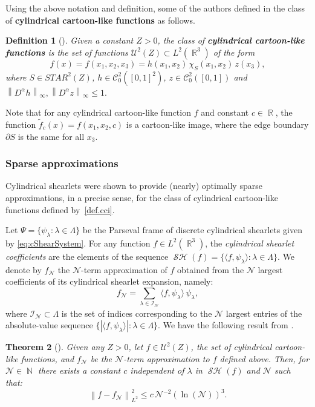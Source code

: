 \documentclass[11pt,a4paper]{article}
\numberwithin{equation}{section}
\newtheorem{theorem}{Theorem}[]
\newtheorem{definition}[theorem]{Definition}
\DeclareMathOperator{\R}{\mathbb{R}}
\DeclareMathOperator{\N}{\mathbb{N}}
\newcommand{\norm}[1]{\left\lVert#1\right\rVert}
\newcommand{\SHsys}{\Psi} %
\DeclareMathOperator{\sh}{\mathcal{SH}}
\newcommand{\ip}[2]{\langle#1,#2\rangle}
\begin{document}
Using the above notation and definition, some of the authors  defined in \cite{Easley21} the class of {\bf cylindrical cartoon-like functions} as follows.
\begin{definition}[{\cite[Equation 12]{Easley21}}]  \label{def.functions}
Given a constant $Z > 0$, the class of {\bf cylindrical cartoon-like functions} is the set of functions $\mathcal{U}^2(Z) \subset L^2(\R^3)$ of the form
\begin{equation}   \label{def.cci}
  f(x) = f(x_1,x_2,x_3) =h(x_1,x_2)\, \chi_{S}(x_1,x_2)\, z(x_3),  
\end{equation}
where $S \in STAR^2(Z)$, $h \in  \mathcal{C}_0^2 ([0, 1]^2 )$, $z \in \mathcal{C}_0^2 ([0, 1])$ and 
$\norm{D^{\alpha} h}_{\infty}, \norm{D^{\alpha} z}_{\infty}\leq 1.$ 
\end{definition}
Note that for any cylindrical cartoon-like function $f$ and constant $c \in \R$, the function $\tilde f_c(x) = f(x_1,x_2,c)$ is a cartoon-like image, where the edge boundary $\partial S$ is the same for all $x_3$.

\subsubsection{Sparse approximations}
Cylindrical shearlets were shown to provide (nearly) optimally sparse approximations, in a precise sense, for the class of cylindrical cartoon-like functions defined by~\cref{def.cci}. 

Let  $\SHsys = \{\psi_\lambda: \lambda \in \Lambda\}$  be the Parseval frame of discrete cylindrical shearlets given by \eqref{eq:cShearSystem}. For any function $f \in L^2(\R^3)$, 
the \emph{cylindrical shearlet coefficients} are the elements of the sequence $\sh (f) = \{\ip{f}{\psi_{\lambda}}:\lambda \in \Lambda \}$. We denote by $f_\mathscr{N}$ the $\mathscr{N}$-term approximation of $f$  obtained from the $\mathscr{N}$ largest coefficients of its cylindrical shearlet expansion, namely:
$$f_\mathscr{N}=\sum_{\lambda \in \mathcal{I}_\mathscr{N}} \ip{f}{\psi_{\lambda}} \, \psi_{\lambda},$$
where $\mathcal{I}_\mathscr{N} \subset \Lambda$ is the set of indices corresponding to the $\mathscr{N}$ largest entries of the absolute-value sequence $\{|\ip{f}{\psi_{\lambda}}|:\lambda \in \Lambda \}$. We have the following result from \cite{Easley21}.


\begin{theorem}[{\cite[Theorem 3]{Easley21}}]  \label{th:main}
Given any $Z>0$, let $f \in \mathcal{U}^2(Z)$, the set of cylindrical cartoon-like functions, and $f_\mathscr{N}$ be the $\mathscr{N}$-term approximation to $f$ defined above. Then, for $\mathscr{N} \in \N$ there exists a constant $c$ independent of $\lambda$ in $\sh (f)$ and $\mathscr{N}$ such that:
$$\norm{f-f_\mathscr{N}}^2_{L^2} \leq c \, \mathscr{N}^{-2} {(\ln(\mathscr{N}))}^{3}.$$
\end{theorem}
\end{document}
